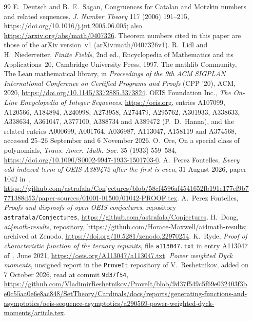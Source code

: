 \documentclass[11pt]{article}
\theoremstyle{remark}
\newcommand{\dsarxiv}{arXiv:\allowbreak math/\allowbreak0407326v1}
\begin{document}
\begin{thebibliography}{99}
E.~Deutsch and B.~E.~Sagan, Congruences for Catalan and Motzkin numbers and
related sequences, \emph{J. Number Theory} 117 (2006) 191--215,
\url{https://doi.org/10.1016/j.jnt.2005.06.005}; also
\url{https://arxiv.org/abs/math/0407326}. Theorem numbers cited in this paper
are those of the arXiv version~v1 (\dsarxiv).
R.~Lidl and H.~Niederreiter, \emph{Finite Fields}, 2nd ed., Encyclopedia of
Mathematics and its Applications~20, Cambridge University Press, 1997.
The mathlib Community, The Lean mathematical library, in \emph{Proceedings of
the 9th ACM SIGPLAN International Conference on Certified Programs and Proofs}
(CPP '20), ACM, 2020, \url{https://doi.org/10.1145/3372885.3373824}.
OEIS Foundation Inc., \emph{The On-Line Encyclopedia of Integer Sequences},
\url{https://oeis.org}, entries A107099, A120566, A184894, A240998, A273958,
A274479, A295762, A301933, A338633, A338634, A361047, A377100, A388734 and
A389472 (P.~D.~Hanna), and the related entries A000699, A001764, A036987,
A113047, A158119 and A374568, accessed 25--26 September and 6 November 2026.
O.~Ore, On a special class of polynomials, \emph{Trans. Amer. Math. Soc.} 35
(1933) 559--584, \url{https://doi.org/10.1090/S0002-9947-1933-1501703-0}.
A.~Perez Fontelles, \emph{Every odd-indexed term of OEIS A389472 after the
first is even}, 31 August 2026, paper 1042 in~\cite{pfrepo},
\url{https://github.com/astrafala/Conjectures/blob/58cf4596af4541652fb191e177ef9b7771388d53/paper-sources/01001-01500/01042-PROOF.tex}.
A.~Perez Fontelles, \emph{Proofs and disproofs of open OEIS conjectures},
repository \texttt{astrafala/Conjectures},
\url{https://github.com/astrafala/Conjectures}.
H.~Dong, \emph{ai4math-results}, repository,
\url{https://github.com/Horace-Maxwell/ai4math-results}; archived at Zenodo,
\url{https://doi.org/10.5281/zenodo.22970254}.
K.~Ryde, \emph{Proof of characteristic function of the ternary repunits},
file \texttt{a113047.txt} in entry A113047 of~\cite{oeis}, June 2021,
\url{https://oeis.org/A113047/a113047.txt}.
\emph{Power weighted Dyck moments}, unsigned report in the \texttt{ProveIt}
repository of V.~Reshetnikov, added on 7 October 2026, read at commit \texttt{9d37f54},
\url{https://github.com/VladimirReshetnikov/ProveIt/blob/9d37f549c5f69e032403f3be0c55aa0e6e8ac848/SetTheory/Cardinals/docs/reports/generating-functions-and-asymptotics/oeis-sequence-asymptotics/a290569-power-weighted-dyck-moments/article.tex}.

\end{thebibliography}
\end{document}

